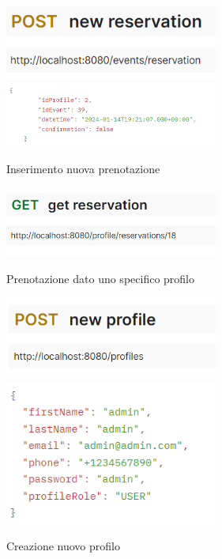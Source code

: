 \begin{figure}[h!]
\includegraphics[width=7cm]{test/postman/tnewres.PNG}\\
\includegraphics[width=7cm]{test/postman/newres.PNG}\\
\caption{Inserimento nuova prenotazione}
\end{figure}

\begin{figure}[h!]
\includegraphics[width=7cm]{test/postman/getreservation.PNG}\\
\caption{Prenotazione dato uno specifico profilo}
\end{figure}

\begin{figure}[h!]
\includegraphics[width=7cm]{test/postman/tnewprofile.PNG}\\
\includegraphics[width=7cm]{test/postman/newprofile.PNG}\\
\caption{Creazione nuovo profilo}
\end{figure}
